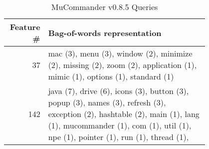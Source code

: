 

\begin{table}[h]
\renewcommand{\arraystretch}{1.3}
\footnotesize
\centering
\caption{MuCommander v0.8.5 Queries}
\begin{tabular}{r|p{0.8\linewidth}}
\toprule
Feature \# & Bag-of-words representation \\
\midrule
37         &

        mac (3),
        menu (3),
        window (2),
        minimize (2),
        missing (2),
        zoom (2),
        application (1),
        mimic (1),
        options (1),
        standard (1)


\\
142       &

        java (7),
        drive (6),
        icons (3),
        button (3),
        popup (3),
        names (3),
        refresh (3),
        exception (2),
        hashtable (2),
        main (1),
        lang (1),
        mucommander (1),
        com (1),
        util (1),
        npe (1),
        pointer (1),
        run (1),
        thread (1),

\\
\bottomrule
\end{tabular}
\label{table:muqueries}
\end{table}

